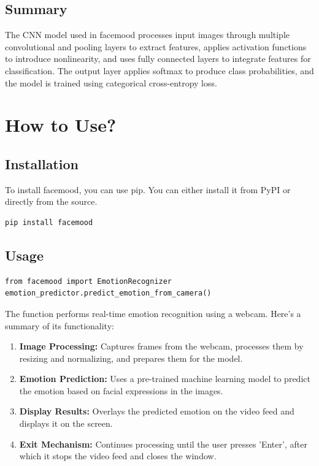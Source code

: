 \documentclass{article}
\begin{document}
\subsection{Summary}
The CNN model used in facemood processes input images through multiple convolutional and pooling layers to extract features, applies activation functions to introduce nonlinearity, and uses fully connected layers to integrate features for classification. The output layer applies softmax to produce class probabilities, and the model is trained using categorical cross-entropy loss.

\vspace{3cm}

\section{How to Use?}
\subsection{Installation}
To install facemood, you can use pip. You can either install it from PyPI or directly from the source.
\begin{lstlisting}[style=customPython]
pip install facemood
\end{lstlisting}
\subsection{Usage}
\begin{lstlisting}[style=customPython]
from facemood import EmotionRecognizer
emotion_predictor.predict_emotion_from_camera()
\end{lstlisting}

\vspace{1cm}

The function performs real-time emotion recognition using a webcam. Here's a summary of its functionality:

\begin{enumerate}
    \item \textbf{Image Processing:} Captures frames from the webcam, processes them by resizing and normalizing, and prepares them for the model.
    \item \textbf{Emotion Prediction:} Uses a pre-trained machine learning model to predict the emotion based on facial expressions in the images.
    \item \textbf{Display Results:} Overlays the predicted emotion on the video feed and displays it on the screen.
    \item \textbf{Exit Mechanism:} Continues processing until the user presses 'Enter', after which it stops the video feed and closes the window.
\end{enumerate}
\end{document}
